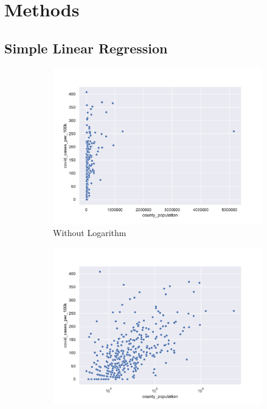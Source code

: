 \documentclass{article}
\begin{document}
\section{Methods}

\subsection{Simple Linear Regression}


\begin{figure}[htbp]
    \centering
    \begin{subfigure}[b]{0.48\textwidth}
    \includegraphics[width=\textwidth]{fig/Relationship Between Population and Cases.pdf}
    \caption{Without Logarithm}
\end{subfigure}
\begin{subfigure}[b]{0.48\textwidth}
    \includegraphics[width=\textwidth]{fig/Relationship Between Population and Cases (Log).pdf}

\end{subfigure}
\end{figure}
\end{document}
